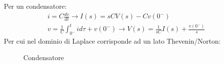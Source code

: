 \documentclass{article}
\numberwithin{equation}{subsection}
\begin{document}
Per un condensatore:
\begin{gather*}
    i=\displaystyle C\frac{dv}{dt}\to I(s)=sCV(s)-Cv(0^-)\\
    v=\displaystyle\frac{1}{C}\int_{0^-}^tid\tau+v(0^-)\to V(s)=\frac{1}{sC}I(s)+\frac{v(0^-)}{s}
\end{gather*}
Per cui nel dominio di Laplace corrisponde ad un lato Thevenin/Norton:
\begin{figure}[ht]%
    \centering
    \qquad
    \qquad
    \caption{Condensatore}
    \label{fig:condensatore-tempo-laplace}
\end{figure}
\end{document}

